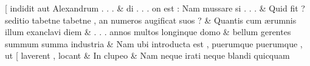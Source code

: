 \documentclass[12pt,onecolumn,twoside,a4paper]{memoir}
\begin{document}
\begin{pairs}
\begin{Leftside}
                              [
                              indidit
                              aut
                              Alexandrum
                              .
                              .
                              . \&
                         \stanza 
                     di
                              .
                              .
                              .
                              on
                              est
                              :
                              Nam
                              mussare
                              si
                              .
                              .
                              . \&
                         \stanza 
                     Quid
                              fit
                              ?
                              seditio
                              tabetne
                              {tabetne}
                              ,
                              an
                              numeros
                              augificat
                              suos
                              ? \&
                         \stanza 
                     Quantis
                              cum
                              ærumnis
                              illum
                              exanclavi
                              diem \&
                         \stanza .
                              .
                              .
                              annos
                              multos
                              longinque
                              domo &
                     bellum
                              gerentes
                              summum
                              summa
                              industria \&
                         \stanza Nam
                              ubi
                              introducta
                              est
                              ,
                              puerumque
                              {puerumque}
                              ,
                              ut
                              [
                              laverent
                              ,
                              locant &
                     In
                              clupeo \&
                         \stanza 
                     Nam
                              neque
                              irati
                              neque
                              blandi
                              quicquam

\end{Leftside}
\end{pairs}
\end{document}

